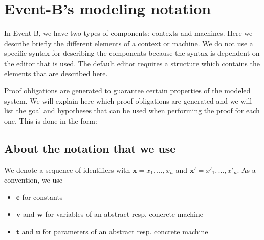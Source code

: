 \newcommand{\varlist}[1]{\mathbf{#1}}
\newcommand{\allconstants}{\varlist{c}}
\newcommand{\absvariables}{\varlist{v}}
\newcommand{\concvariables}{\varlist{w}}
\newcommand{\allvariables}{{\absvariables,\concvariables}}
\newcommand{\absparameters}{\varlist{t}}
\newcommand{\concparameters}{\varlist{u}}
\newcommand{\allparameters}{{\absparameters,\concparameters}}
\newcommand{\absbeforeafter}{\mathcal{S}}
\newcommand{\concbeforeafter}{\mathcal{T}}

\clearpage

\section{Event-B's modeling notation}
\label{modeling_notation}

In Event-B, we have two types of components: contexts and machines.
Here we describe briefly the different elements of a context or machine.
We do not use a specific syntax for describing the components because the syntax is dependent on the editor that is
used. The default editor requires a structure which contains the elements that are described here.

Proof obligations are generated to guarantee certain properties of the modeled system.
We will explain here which proof obligations are generated and we will list the goal and hypotheses that can be used
when performing the proof for each one.
This is done in the form:

\subsection{About the notation that we use}
\label{about_the_notation}

We denote a sequence of identifiers with $\varlist{x} = x_1,\ldots,x_n$ and $\varlist{x}' = x'_1,\ldots,x'_n$.
As a convention, we use
\begin{itemize}
\item $\allconstants$ for constants
\item $\absvariables$ and $\concvariables$ for variables of an abstract resp. concrete machine
\item $\absparameters$ and $\concparameters$ for parameters of an abstract resp. concrete machine
\end{itemize}


